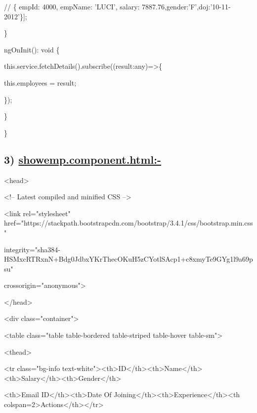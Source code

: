 \documentclass[11pt,twoside]{article}
\begin{document}
  \hspace*{10}// \{ empId: 4000, empName: 'LUCI', salary: 7887.76,gender:'F',doj:'10-11-2012'\}];

  \hspace*{5}\}

\vspace{1\baselineskip}
\hspace*{5}ngOnInit(): void \{ 
  
  \hspace*{10}this.service.fetchDetails().subscribe((result:any)=>\{

    \hspace*{15}this.employees = result; 

    \hspace*{10}\});

    \hspace*{5}\} 

\vspace{1\baselineskip}
\}

\subsection*{3) \uline{showemp.component.html:-}}

\vspace{1\baselineskip}
<head>

\hspace*{10}<!-- Latest compiled and minified CSS -->

\hspace*{10}<link rel="stylesheet" href="https://stackpath.bootstrapcdn.com/bootstrap/3.4.1/css/bootstrap.min.css"

\hspace*{20}integrity="sha384-HSMxcRTRxnN+Bdg0JdbxYKrThecOKuH5zCYotlSAcp1+c8xmyTe9GYg1l9a69psu"

crossorigin="anonymous">

</head>

\vspace{1\baselineskip}
<div class="container">

<table class="table table-bordered table-striped table-hover table-sm">

  \hspace*{10}<thead>

  \hspace*{10}<tr class="bg-info text-white"><th>ID</th><th>Name</th><th>Salary</th><th>Gender</th>

  \hspace*{20}<th>Email ID</th><th>Date Of Joining</th><th>Experience</th><th colspan=2>Actions</th></tr> 
\end{document}
